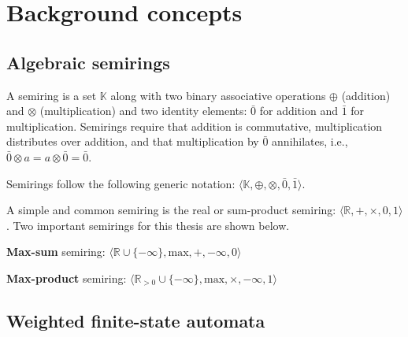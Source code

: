 \chapter{Background concepts}

\label{background}

\section{Algebraic semirings}

\begin{definition}
  A semiring is a set $\mathbb{K}$ along with two binary associative operations $\oplus$ (addition) and $\otimes$ (multiplication) and two identity elements: $\bar{0}$ for addition and $\bar{1}$ for multiplication. Semirings require that addition is commutative, multiplication distributes over addition, and that multiplication by $\bar{0}$ annihilates, i.e., $\bar{0} \otimes a = a \otimes \bar{0} = \bar{0}$.

\begin{remark}
  Semirings follow the following generic notation: $\langle \mathbb{K}, \oplus, \otimes, \bar{0}, \bar{1} \rangle$.
\end{remark}

\begin{remark}
  A simple and common semiring is the real or sum-product semiring: $\langle \mathbb{R}, +, \times, 0, 1 \rangle$. Two important semirings for this thesis are shown below.
\end{remark}

\begin{remark}
  \textbf{Max-sum} semiring: $\langle \mathbb{R} \cup \{-\infty\}, \text{max}, +, -\infty, 0 \rangle$
\end{remark}

\begin{remark}
  \textbf{Max-product} semiring: $\langle \mathbb{R}_{>0} \cup \{-\infty\}, \text{max}, \times, -\infty, 1 \rangle$
\end{remark}

\end{definition}

\section{Weighted finite-state automata}

